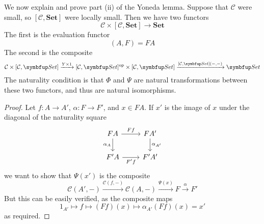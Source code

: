 We now explain and prove part (ii) of the Yoneda lemma.
Suppose that \( \mathcal C \) were small, so \( [\mathcal C, \mathbf{Set}] \) were locally small.
Then we have two functors
\[ \mathcal C \times [\mathcal C, \mathbf{Set}] \to \mathbf{Set} \]
The first is the evaluation functor
\[ (A, F) = FA \]
The second is the composite
\[ \mathcal C \times [\mathcal C, \mathbf{Set}] \xrightarrow{Y \times 1} [\mathcal C, \mathbf{Set}]^\cop \times [\mathcal C, \mathbf{Set}] \xrightarrow{[\mathcal C, \mathbf{Set}](-, -)} \mathbf{Set} \]
The naturality condition is that \( \Phi \) and \( \Psi \) are natural transformations between these two functors, and thus are natural isomorphisms.
\begin{proof}
    Let \( f : A \to A' \), \( \alpha : F \to F' \), and \( x \in F A \).
    If \( x' \) is the image of \( x \) under the diagonal of the naturality square
    \[\begin{tikzcd}
        FA & {FA'} \\
        {F'A} & {F'A'}
        \arrow["Ff", from=1-1, to=1-2]
        \arrow["{\alpha_{A'}}", from=1-2, to=2-2]
        \arrow["{\alpha_A}"', from=1-1, to=2-1]
        \arrow["{F'f}"', from=2-1, to=2-2]
    \end{tikzcd}\]
    we want to show that \( \Psi(x') \) is the composite
    \[ \mathcal C(A', -) \xrightarrow{\mathcal C(f, -)} \mathcal C(A, -) \xrightarrow{\Psi(x)} F \xrightarrow \alpha F' \]
    But this can be easily verified, as the composite maps
    \[ 1_{A'} \mapsto f \mapsto (Ff)(x) \mapsto \alpha_{A'}(Ff)(x) = x' \]
    as required.
\end{proof}
